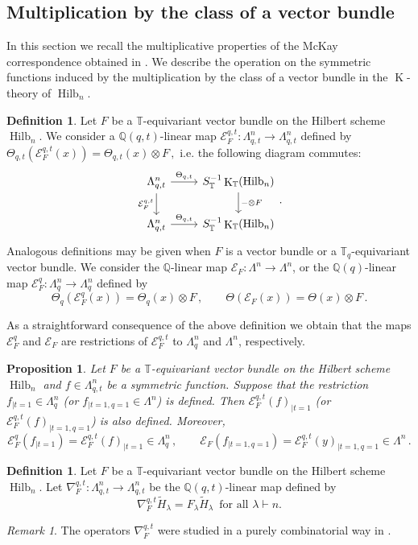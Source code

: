 \documentclass[12pt,a4paper]{amsart}
\theoremstyle{plain}
\newtheorem{pro}[tw]{Proposition}
\theoremstyle{definition}
\newtheorem{df}[tw]{Definition}
\theoremstyle{remark}
\newtheorem{rem}[tw]{Remark}
\newcommand{\Hilb}[1]{\operatorname{Hilb}_{{#1}}}
\newcommand{\QQ}{\mathbb{Q}}
\newcommand{\TT}{\mathbb{T}}
\newcommand{\Tq}{{\mathbb{T}_q}}
\newcommand{\E}{\mathcal{E}}
\DeclareMathOperator{\KTh}{K}
\begin{document}
\subsection{Multiplication by the class of a vector bundle} \label{s:McKay2}
 In this section we recall the multiplicative properties of the McKay correspondence obtained in \cite{Boissiere}. We describe the operation on the  symmetric functions induced by the multiplication by the class of a vector bundle in the $\KTh$-theory of $\Hilb{n}$.
\begin{df}
	Let $F$ be a $\TT$-equivariant vector bundle on the Hilbert scheme $\Hilb{n}$. We consider a $\QQ(q,t)$-linear map $\E^{q,t}_F:\Lambda^n_{q,t} \to \Lambda^n_{q,t}$ defined by
	$\Theta_{q,t}(\E^{q,t}_F(x))=\Theta_{q,t}(x)\otimes F \,,$
	i.e. the following diagram commutes:
$$
	\begin{tikzcd}
		{\Lambda^n_{q,t}} & {S^{-1}_\TT\KTh_\TT(\Hilb{n})} \\
		{\Lambda^n_{q,t}} & {S^{-1}_\TT\KTh_\TT(\Hilb{n})}
		\arrow["{\E^{q,t}_F}"', from=1-1, to=2-1]
		\arrow["{\Theta_{q,t}}", from=1-1, to=1-2]
		\arrow["{-\otimes F}", from=1-2, to=2-2]
		\arrow["{\Theta_{q,t}}", from=2-1, to=2-2]
	\end{tikzcd}.
$$
Analogous definitions may be given when $F$ is a vector bundle or a $\Tq$-equivariant vector bundle.  We consider the $\QQ$-linear map $\E_F:\Lambda^n \to \Lambda^n$, or the $\QQ(q)$-linear map $\E^{q}_F:\Lambda^n_{q} \to \Lambda^n_{q}$ defined by
$$\Theta_{q}(\E^{q}_F(x))=\Theta_{q}(x)\otimes F\,, \qquad \Theta(\E_F(x))=\Theta(x)\otimes F \,.$$
\end{df}
As a straightforward consequence of the above definition we obtain that the maps $\E_F^{q}$ and $\E_F$ are restrictions of $\E_F^{q,t}$ to $\Lambda^n_{q}$ and $\Lambda^n$, respectively.
\begin{pro} \label{pro:restriction1}
	Let $F$ be a $\TT$-equivariant vector bundle on the Hilbert scheme $\Hilb{n}$ and $f\in \Lambda^n_{q,t}$ be a symmetric function. Suppose that the restriction $f_{|t=1} \in \Lambda^n_{q}$ (or $f_{|t=1,q=1}\in \Lambda^n$) is defined. Then $\E_F^{q,t}(f)_{|t=1}$ (or $\E_F^{q,t}(f)_{|t=1,q=1}$) is also defined. Moreover,
	$$\E^q_F(f_{|t=1})=\E_F^{q,t}(f)_{|t=1}\in \Lambda^n_{q}\,, \qquad \E_F(f_{|t=1,q=1})=\E_F^{q,t}(y)_{|t=1,q=1}\in \Lambda^n\,.$$
\end{pro}

\begin{df}
	Let $F$ be a $\TT$-equivariant vector bundle on the Hilbert scheme $\Hilb{n}$. Let $\nabla^{q,t}_F:\Lambda^n_{q,t} \to \Lambda^n_{q,t}$ be the $\QQ(q,t)$-linear map defined by
	$$ \nabla^{q,t}_F\tilde{H}_\lambda=F_\lambda \tilde{H}_\lambda \, \textrm{ for all } \lambda\vdash n.$$
\end{df}
\begin{rem}
	The operators $\nabla^{q,t}_F$ were studied in a  purely combinatorial way in \cite{nabla1}.
\end{rem}
\end{document}
